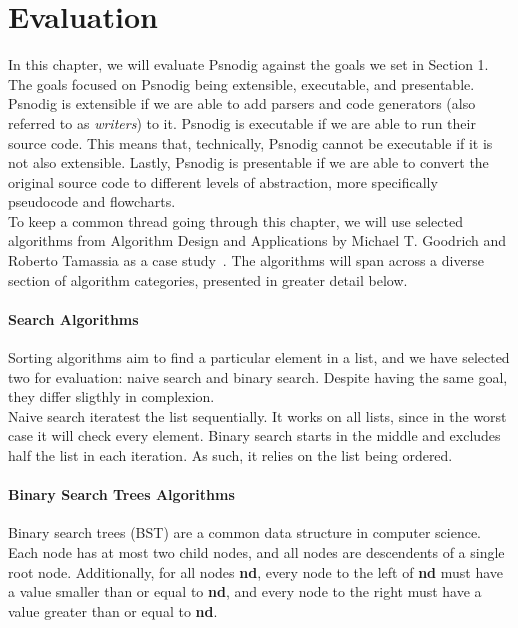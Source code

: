 \chapter{Evaluation}

In this chapter, we will evaluate Psnodig against the goals we set in Section 1. The goals focused on Psnodig being extensible, executable, and presentable. \\

Psnodig is extensible if we are able to add parsers and code generators (also referred to as \textit{writers}) to it. Psnodig is executable if we are able to run their source code. This means that, technically, Psnodig cannot be executable if it is not also extensible. Lastly, Psnodig is presentable if we are able to convert the original source code to different levels of abstraction, more specifically pseudocode and flowcharts. \\

To keep a common thread going through this chapter, we will use selected algorithms from Algorithm Design and Applications by
Michael T. Goodrich and Roberto Tamassia as a case study~\cite{pseudocodeInBook2}. The algorithms will span across a diverse section of algorithm categories, presented in greater detail below.

\subsubsection{Search Algorithms}

Sorting algorithms aim to find a particular element in a list, and we have selected two for evaluation: naive search and binary search. Despite having the same goal, they differ sligthly in complexion. \\

Naive search iteratest the list sequentially. It works on all lists, since in the worst case it will check every element. Binary search starts in the middle and excludes half the list in each iteration. As such, it relies on the list being ordered.

\subsubsection{Binary Search Trees Algorithms}

Binary search trees (BST) are a common data structure in computer science. Each node has at most two child nodes, and all nodes are descendents of a single root node. Additionally, for all nodes \textbf{nd}, every node to the left of \textbf{nd} must have a value smaller than or equal to \textbf{nd}, and every node to the right must have a value greater than or equal to \textbf{nd}. \\

